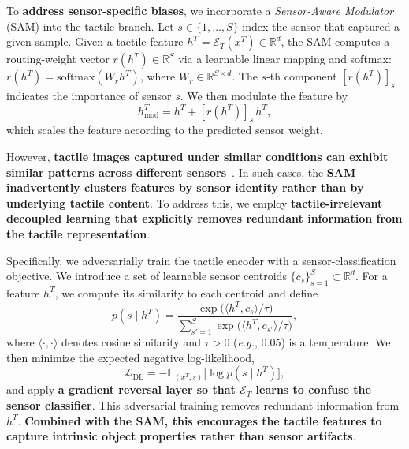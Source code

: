 \documentclass[letterpaper]{article} %
\theoremstyle{definition}                %
\theoremstyle{plain}                     %
\theoremstyle{remark}                    %
\begin{document}
To \textbf{address sensor-specific biases}, we incorporate a \emph{Sensor-Aware Modulator} (SAM) into the tactile branch. Let $s \in \{1,\dots,S\}$ index the sensor that captured a given sample. Given a tactile feature $h^T = \mathcal{E}_T(x^T)\in\mathbb{R}^d$, the SAM computes a routing-weight vector $r(h^T)\in\mathbb{R}^S$ via a learnable linear mapping and softmax: $r(h^T) = \mathrm{softmax}(W_r h^T)$, where $W_r \in \mathbb{R}^{S\times d}$. The $s$-th component $[r(h^T)]_s$ indicates the importance of sensor $s$. We then modulate the feature by 
\begin{equation}
h^T_{\mathrm{mod}} = h^T + [r(h^T)]_s\,h^T,
\end{equation}
which scales the feature according to the predicted sensor weight.

However, \textbf{tactile images captured under similar conditions can exhibit similar patterns across different sensors}~\cite{ou2024marker}. In such cases, the \textbf{SAM inadvertently clusters features by sensor identity rather than by underlying tactile content}. To address this, we employ \textbf{tactile-irrelevant decoupled learning that explicitly removes redundant information from the tactile representation}.

Specifically, we adversarially train the tactile encoder with a sensor-classification objective. We introduce a set of learnable sensor centroids $\{c_s\}_{s=1}^S\subset\mathbb{R}^d$. For a feature $h^T$, we compute its similarity to each centroid and define
\begin{equation}
p(s \mid h^T) = \frac{\exp\bigl(\langle h^T, c_s\rangle/\tau\bigr)}{\sum_{s'=1}^S \exp\bigl(\langle h^T, c_{s'}\rangle/\tau\bigr)},
\end{equation}
where $\langle \cdot, \cdot \rangle$ denotes cosine similarity and $\tau>0$ (\textit{e.g.}, 0.05) is a temperature. We then minimize the expected negative log-likelihood,
\begin{equation}
\mathcal{L}_{\text{DL}} = -\mathbb{E}_{(x^T,s)}\bigl[\log p(s\mid h^T)\bigr],
\end{equation}
and apply \textbf{a gradient reversal layer so that $\mathcal{E}_T$ learns to confuse the sensor classifier}. This adversarial training removes redundant information from $h^T$. \textbf{Combined with the SAM, this encourages the tactile features to capture intrinsic object properties rather than sensor artifacts}.
\end{document}
